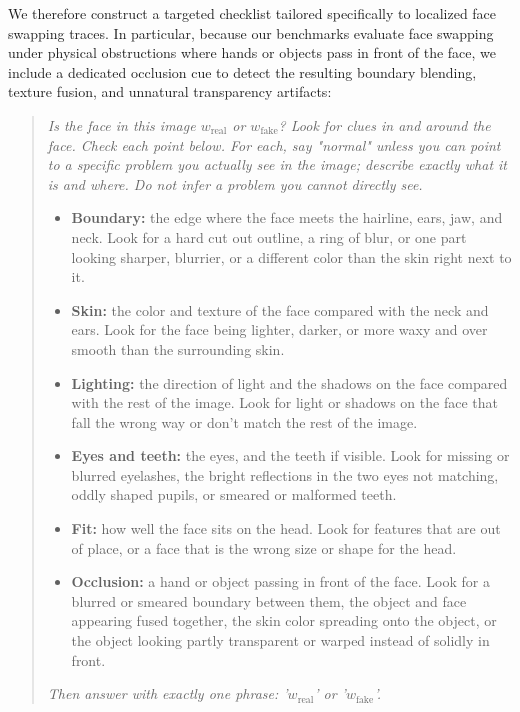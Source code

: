 \begin{enumerate}
    We therefore construct a targeted checklist tailored specifically to localized face swapping traces. In particular, because our benchmarks evaluate face swapping under physical obstructions where hands or objects pass in front of the face, we include a dedicated occlusion cue to detect the resulting boundary blending, texture fusion, and unnatural transparency artifacts:
    \begin{quote}
        \emph{Is the face in this image $w_{\text{real}}$ or $w_{\text{fake}}$? Look for clues in and around the face. Check each point below. For each, say "normal" unless you can point to a specific problem you actually see in the image; describe exactly what it is and where. Do not infer a problem you cannot directly see.}
        \begin{itemize}
            \item \textbf{Boundary:} the edge where the face meets the hairline, ears, jaw, and neck. Look for a hard cut out outline, a ring of blur, or one part looking sharper, blurrier, or a different color than the skin right next to it.
            \item \textbf{Skin:} the color and texture of the face compared with the neck and ears. Look for the face being lighter, darker, or more waxy and over smooth than the surrounding skin.
            \item \textbf{Lighting:} the direction of light and the shadows on the face compared with the rest of the image. Look for light or shadows on the face that fall the wrong way or don't match the rest of the image.
            \item \textbf{Eyes and teeth:} the eyes, and the teeth if visible. Look for missing or blurred eyelashes, the bright reflections in the two eyes not matching, oddly shaped pupils, or smeared or malformed teeth.
            \item \textbf{Fit:} how well the face sits on the head. Look for features that are out of place, or a face that is the wrong size or shape for the head.
            \item \textbf{Occlusion:} a hand or object passing in front of the face. Look for a blurred or smeared boundary between them, the object and face appearing fused together, the skin color spreading onto the object, or the object looking partly transparent or warped instead of solidly in front.
        \end{itemize}
        \emph{Then answer with exactly one phrase: '$w_{\text{real}}$' or '$w_{\text{fake}}$'.}
    \end{quote}

\end{enumerate}
